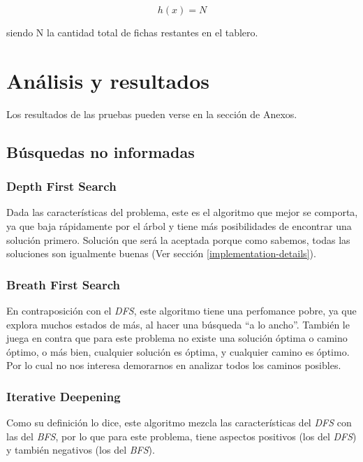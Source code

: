\documentclass[a4paper,10pt]{article}
\begin{document}
    \[ h(x) = N \] 

    siendo N la cantidad total de fichas restantes en el tablero.

\section{Análisis y resultados}


Los resultados de las pruebas pueden verse en la sección de Anexos.

\subsection{Búsquedas no informadas}

    \subsubsection{Depth First Search}
    Dada las características del problema, este es el algoritmo que mejor se comporta, ya que baja rápidamente por el árbol y tiene más posibilidades de encontrar una solución primero.
    Solución que será la aceptada porque como sabemos, todas las soluciones son igualmente buenas (Ver sección \ref{implementation-details}).\\

    
    \subsubsection{Breath First Search}
    En contraposición con el \textit{DFS}, este algoritmo tiene una perfomance pobre, ya que explora muchos estados de más, al hacer una búsqueda ``a lo ancho''. También le juega en 
    contra que para este problema no existe una solución óptima o camino óptimo, o más bien, cualquier solución es óptima, y cualquier camino es óptimo. Por lo cual no nos interesa 
    demorarnos en analizar todos los caminos posibles.

    
    \subsubsection{Iterative Deepening}
    Como su definición lo dice, este algoritmo mezcla las características del \textit{DFS} con las del \textit{BFS}, por lo que para este problema, tiene aspectos positivos (los del 
    \textit{DFS}) y también negativos (los del \textit{BFS}). 
\end{document}
